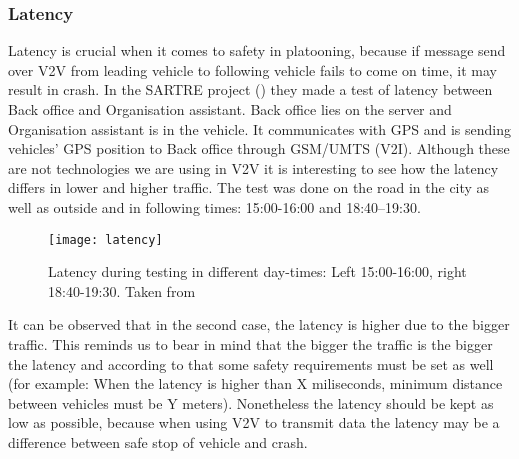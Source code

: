 \subsubsection{Latency}
Latency is crucial when it comes to safety in platooning, because if message send over V2V from leading vehicle to following vehicle fails to come on time, it may result in crash. In the SARTRE project (\cite{Chan2012ProjectSARTRE}) they made a test of latency between Back office and Organisation assistant. Back office lies on the server and Organisation assistant is in the vehicle. It communicates with GPS and is sending vehicles’ GPS position to Back office through GSM/UMTS (V2I). Although these are not technologies we are using in V2V it is interesting to see how the latency differs in lower and higher traffic. The test was done on the road in the city as well as outside and in following times: 15:00-16:00 and 18:40–19:30.
% 
\begin{figure}
    \centering
    \texttt{[image: latency]}
    \caption{Latency during testing in different day-times: Left 15:00-16:00, right 18:40-19:30. Taken from \cite[p. 24]{Chan2012ProjectSARTRE}}
    \label{fig:latency}
\end{figure}
% 
It can be observed that in the second case, the latency is higher due to the bigger traffic. This reminds us to bear in mind that the bigger the traffic is the bigger the latency and according to that some safety requirements must be set as well (for example: When the latency is higher than X miliseconds, minimum distance between vehicles must be Y meters). Nonetheless the latency should be kept as low as possible, because when using V2V to transmit data the latency may be a difference between safe stop of vehicle and crash.
